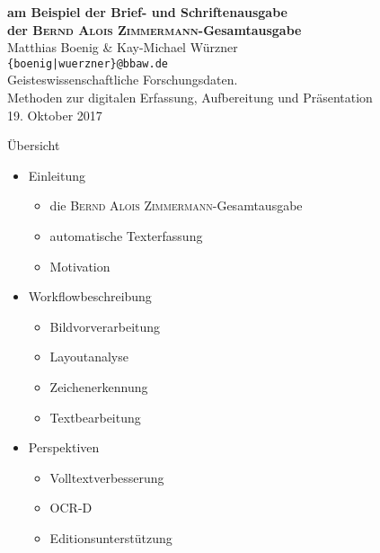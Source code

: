 \documentclass{bbawslides}
\begin{document}
\providecommand{\Title}{}


\begin{bbawtitle}
  \vspace*{0.5em}%
  \textcolor{bbawred}{\bf am Beispiel der Brief- und Schriftenausgabe\\der \textsc{Bernd Alois Zimmermann}-Gesamtausgabe}\\[4ex]
  Matthias Boenig \& Kay-Michael Würzner\\[-.25em]%
  \textcolor{urlColor}{\texttt{{\small \{boenig|wuerzner\}@bbaw.de}}}
  \\[1.5em]
  {\scriptsize{%
    Geisteswissenschaftliche Forschungsdaten.\\Methoden zur digitalen Erfassung, Aufbereitung und Präsentation\\%
    19. Oktober 2017\\%
  }}
\end{bbawtitle}
\slideStyleFrame

\renewcommand{\footerText}{\tiny 19. Oktober 2017, Workshop AG eHumanities}

\begin{bbawslide}{Übersicht}
  \vspace*{7mm}%
  \centerslidestrue%
  \begin{itemize}
    \item Einleitung
    \begin{itemize}\small
      \item die \textsc{Bernd Alois Zimmermann}-Gesamtausgabe
      \item automatische Texterfassung
      \item Motivation
    \end{itemize}
    \item Workflowbeschreibung
    \begin{itemize}\small
      \item Bildvorverarbeitung
      \item Layoutanalyse
      \item Zeichenerkennung
      \item Textbearbeitung
    \end{itemize}
    \item Perspektiven
    \begin{itemize}\small
      \item Volltextverbesserung
      \item OCR-D
      \item Editionsunterstützung
    \end{itemize}
  \end{itemize}
\end{bbawslide}
\end{document}
